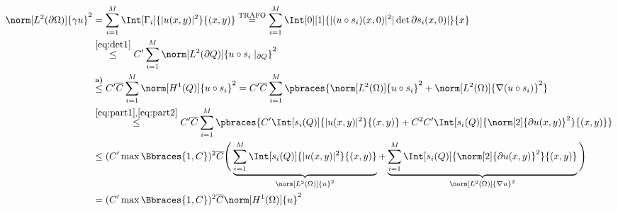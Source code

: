 \begin{solution}
\begin{enumerate}[label = \textbf{\alph*)}]
\begin{enumerate}[label = \arabic*.]
    \begin{align*}
      \norm[L^2(\partial \Omega)]{\gamma u}^2
      & =
      \sum_{i=1}^M
      \Int[\Gamma_i]{|u(x, y)|^2}{(x, y)}
      \stackrel
      {
        \text{TRAFO}
      }{=}
      \sum_{i=1}^M
      \Int[0][1]{|(u \circ s_i)(x, 0)|^2 |\det \partial s_i(x, 0)|}{x} \\
      & \stackrel{\eqref{eq:det1}}{\leq}
      C^\prime
      \sum_{i=1}^M
      \norm[L^2(\partial Q)]{u \circ s_i \mid_{\partial Q}}^2 \\
      & \stackrel
      {
        \textbf{a)}
      }{\leq}
      C^\prime
      \overline{C}
      \sum_{i=1}^M
      \norm[H^1(Q)]{u \circ s_i}^2
      =
      C^\prime
      \overline{C}
      \sum_{i=1}^M
      \pbraces
      {
        \norm[L^2(\Omega)]{u \circ s_i}^2
        +
        \norm[L^2(\Omega)]{\nabla (u \circ s_i)}^2
      } \\
      & \stackrel
      {
        \eqref{eq:part1},
        \eqref{eq:part2}
      }{\leq}
      C^\prime
      \overline{C}
      \sum_{i=1}^M
      \pbraces
      {
        C^\prime
        \Int[s_i(Q)]{|u(x, y)|^2}{(x, y)}
        +
        C^2 C^\prime
        \Int[s_i(Q)]{\norm[2]{\partial u(x, y)}^2}{(x, y)}
      } \\
      & \leq
      (
        C^\prime
        \max \Bbraces{1, C}
      )^2
      \overline{C}
      \Bigg (
        \underbrace
        {
          \sum_{i=1}^M
          \Int[s_i(Q)]{|u(x, y)|^2}{(x, y)}
        }_{
          \norm[L^2(\Omega)]{u}^2
        }
        +
        \underbrace
        {
          \sum_{i=1}^M
          \Int[s_i(Q)]{\norm[2]{\partial u(x, y)}^2}{(x, y)}
        }_{
          \norm[L^2(\Omega)]{\nabla u}^2
        }
      \Bigg ) \\
      & =
      (
        C^\prime
        \max \Bbraces{1, C}
      )^2
      \overline{C}
      \norm[H^1(\Omega)]{u}^2
    \end{align*}

  \end{enumerate}

  \end{enumerate}

\end{solution}


